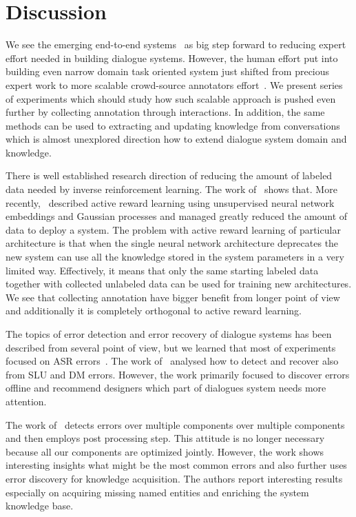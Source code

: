 \documentclass[11pt]{article}
\begin{document}
\section{Discussion}
\label{sec:discussion}

We see the emerging end-to-end systems~\cite{williams2016end,weston2015endtoend_prereq,wen_networkbased_2016} as big step forward to reducing expert effort needed in building dialogue systems.
However, the human effort put into building even narrow domain task oriented system just shifted from precious expert work to more scalable crowd-source annotators effort~\cite{wen_networkbased_2016,serban_building_2015}.
We present series of experiments which should study how such scalable approach is pushed even further by collecting annotation through interactions.
In addition, the same methods can be used to extracting and updating knowledge from conversations which is almost unexplored direction how to extend dialogue system domain and knowledge.

There is well established research direction of reducing the amount of labeled data needed by inverse reinforcement learning.
The work of~\cite{nouri_cultural_2012} shows that.
More recently,~\cite{su2016active} described active reward learning using unsupervised neural network embeddings and Gaussian processes and managed greatly reduced the amount of data to deploy a system.
The problem with active reward learning of particular architecture is that when the single neural network architecture deprecates the new system can use all the knowledge stored in the system parameters in a very limited way.
Effectively, it means that only the same starting labeled data together with collected unlabeled data can be used for training new architectures. 
We see that collecting annotation have bigger benefit from longer point of view and additionally it is completely orthogonal to active reward learning.

The topics of error detection and error recovery of dialogue systems has been described from several point of view, but we learned that most of experiments focused on ASR errors~\cite{skantze_error_2007}.
The work of~\cite{meena_datadriven_2016} analysed how to detect and recover also from SLU and DM errors.
However, the work primarily focused to discover errors offline and recommend designers which part of dialogues system needs more attention.

The work of~\cite{pappu_knowledge_2014} detects errors over multiple components over multiple components and then employs post processing step.
This attitude is no longer necessary because all our components are optimized jointly.
However, the work shows interesting insights what might be the most common errors and also further uses error discovery for knowledge acquisition.
The authors report interesting results especially on acquiring missing named entities and enriching the system knowledge base.
\end{document}
